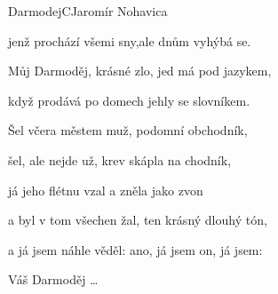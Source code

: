 \begin{song}{Darmodej}{C}{Jaromír Nohavica}
\begin{SBChorus}
jenž prochází všemi sny,ale dnům vyhýbá se.

Můj Darmoděj, krásné zlo, jed má pod jazykem,

když prodává po domech jehly se slovníkem.

\end{SBChorus}
\begin{SBVerse}
Šel včera městem muž, podomní obchodník,

šel, ale nejde už, krev skápla na chodník,

já jeho flétnu vzal a zněla jako zvon

a byl v tom všechen žal, ten krásný dlouhý tón,

a já jsem náhle věděl: ano, já jsem on, já jsem:

  \end{SBVerse}
  
\begin{SBChorus}
Váš Darmoděj \dots
\end{SBChorus}
 \end{song}
 
\pagebreak
